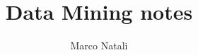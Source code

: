 \documentclass[a4paper, openany]{book}
\theoremstyle{definition}%
\begin{document}
    \title{Data Mining notes}
    \author{Marco Natali}
    \date{}
    \maketitle

    \tableofcontents
    \listoffigures

\end{document}
